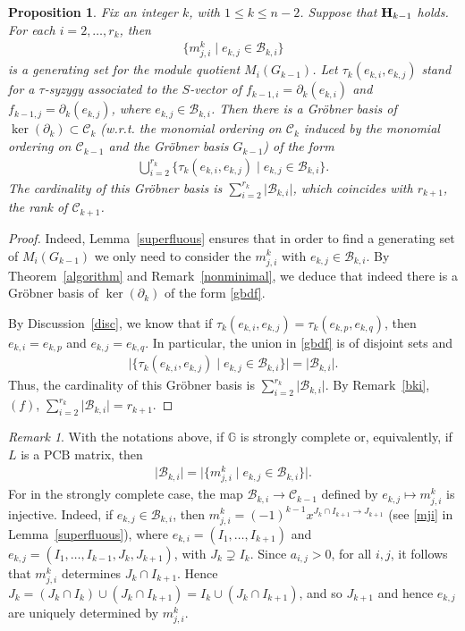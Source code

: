 \documentclass[10pt]{amsart}
\newcommand{\mbg}{\mbox{$\mathbb{G}$}}
\newcommand{\mcb}{\mbox{$\mathcal{B}$}}
\newcommand{\mcc}{\mbox{$\mathcal{C}$}}
\newcommand{\pcb}{\mbox{$\mathrm{PCB}$}}
\newcommand{\mbfh}{\mbox{${\bf H}$}}
\newcommand{\dif}{\mbox{$\partial$}}
\newtheorem{proposition}[cdrthm]{Proposition}
\theoremstyle{definition}
\theoremstyle{remark}
\newtheorem{remark}[cdrthm]{Remark}
\begin{document}
\begin{proposition}\label{gbdesiredform}
Fix an integer $k$, with $1\leq k\leq n-2$. Suppose that $\mbfh_{k-1}$
holds. For each $i=2,\ldots ,r_k$, then
\begin{eqnarray*}
\{ m^k_{j,i}\mid e_{k,j}\in\mcb_{k,i}\}
\end{eqnarray*}
is a generating set for the module quotient $M_i(G_{k-1})$. Let
$\tau_k(e_{k,i},e_{k,j})$ stand for a $\tau$-syzygy associated to the
$S$-vector of $f_{k-1,i}=\dif_k(e_{k,i})$ and
$f_{k-1,j}=\dif_k(e_{k,j})$, where $e_{k,j}\in\mcb_{k,i}$. Then there
is a Gr\"obner basis of $\ker(\dif_k)\subset\mcc_k$ (w.r.t. the
monomial ordering on $\mcc_k$ induced by the monomial ordering on
$\mcc_{k-1}$ and the Gr\"obner basis $G_{k-1}$) of the form
\begin{eqnarray}\label{gbdf}
\bigcup_{i=2}^{r_k}\{\tau_{k}(e_{k,i},e_{k,j})\mid
e_{k,j}\in\mcb_{k,i}\}.
\end{eqnarray}
The cardinality of this Gr\"obner basis is
$\sum_{i=2}^{r_k}\lvert\mcb_{k,i}\rvert$, which coincides with
$r_{k+1}$, the rank of $\mcc_{k+1}$.
\end{proposition}
\begin{proof}
Indeed, Lemma~\ref{superfluous} ensures that in order to find a
generating set of $M_i(G_{k-1})$ we only need to consider the
$m^{k}_{j,i}$ with $e_{k,j}\in\mcb_{k,i}$. By Theorem~\ref{algorithm}
and Remark~\ref{nonminimal}, we deduce that indeed there is a Gr\"obner
basis of $\ker(\dif_k)$ of the form \eqref{gbdf}.

By Discussion~\ref{disc}, we know that if
$\tau_{k}(e_{k,i},e_{k,j})=\tau_k(e_{k,p},e_{k,q})$, then
$e_{k,i}=e_{k,p}$ and $e_{k,j}=e_{k,q}$. In particular, the union in
\eqref{gbdf} is of disjoint sets and
\begin{eqnarray*}
\lvert\{\tau_k(e_{k,i},e_{k,j})\mid
e_{k,j}\in\mcb_{k,i}\}\rvert=\lvert\mcb_{k,i}\rvert. 
\end{eqnarray*}
Thus, the cardinality of this Gr\"obner basis is
$\sum_{i=2}^{r_k}\lvert\mcb_{k,i}\rvert$. By Remark~\ref{bki}, $(f)$,
$\sum_{i=2}^{r_k}\lvert\mcb_{k,i}\rvert=r_{k+1}$.
\end{proof}

\begin{remark}\label{min-m}
With the notations above, if $\mbg$ is strongly complete or,
equivalently, if $L$ is a $\pcb$ matrix, then
\begin{eqnarray*}
\vert\mcb_{k,i}\rvert=
\lvert \{ m^k_{j,i}\mid e_{k,j}\in\mcb_{k,i}\}\rvert.
\end{eqnarray*}
For in the strongly complete case, the map $\mcb_{k,i}\to\mcc_{k-1}$
defined by $e_{k,j}\mapsto m^{k}_{j,i}$ is injective. Indeed, if
$e_{k,j}\in\mcb_{k,i}$, then $m^k_{j,i}=(-1)^{k-1}x^{J_{k}\cap
  I_{k+1}\to J_{k+1}}$ (see \eqref{mji} in Lemma~\ref{superfluous}),
where $e_{k,i}=(I_1,\ldots ,I_{k+1})$ and $e_{k,j}=(I_1,\ldots,
I_{k-1},J_k,J_{k+1})$, with $J_k\supsetneq I_k$. Since $a_{i,j}>0$,
for all $i,j$, it follows that $m^k_{j,i}$ determines $J_k\cap
I_{k+1}$. Hence $J_k=(J_k\cap I_k)\cup (J_k\cap I_{k+1})=I_k\cup
(J_k\cap I_{k+1})$, and so $J_{k+1}$ and hence $e_{k,j}$ are uniquely
determined by $m^k_{j,i}$.
\end{remark}
\end{document}
